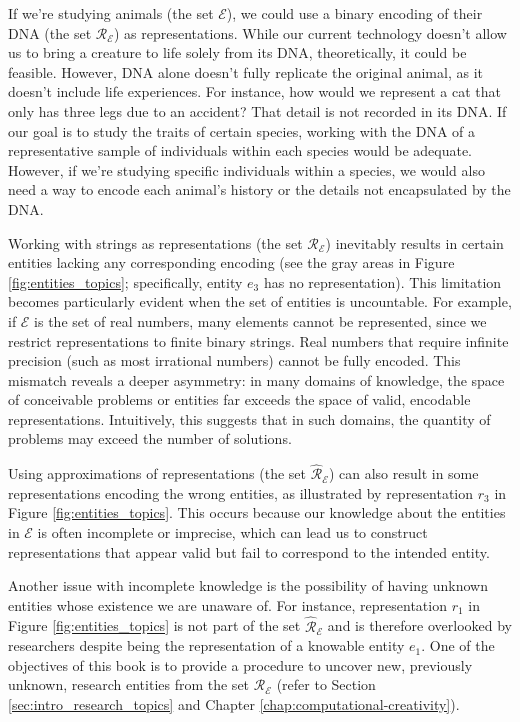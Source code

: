 \begin{example}
\label{ex:animals_DNA}
If we're studying animals (the set $\mathcal{E}$), we could use a binary encoding of their DNA (the set $\mathcal{R_\mathcal{E}}$) as representations. While our current technology doesn't allow us to bring a creature to life solely from its DNA, theoretically, it could be feasible. However, DNA alone doesn't fully replicate the original animal, as it doesn't include life experiences. For instance, how would we represent a cat that only has three legs due to an accident? That detail is not recorded in its DNA. If our goal is to study the traits of certain species, working with the DNA of a representative sample of individuals within each species would be adequate. However, if we're studying specific individuals within a species, we would also need a way to encode each animal's history or the details not encapsulated by the DNA.
\end{example}

Working with strings as representations (the set $\mathcal{R}_\mathcal{E}$) inevitably results in certain entities lacking any corresponding encoding (see the gray areas in Figure \ref{fig:entities_topics}; specifically, entity $e_3$ has no representation). This limitation becomes particularly evident when the set of entities is uncountable. For example, if $\mathcal{E}$ is the set of real numbers, many elements cannot be represented, since we restrict representations to finite binary strings. Real numbers that require infinite precision (such as most irrational numbers) cannot be fully encoded. This mismatch reveals a deeper asymmetry: in many domains of knowledge, the space of conceivable problems or entities far exceeds the space of valid, encodable representations. Intuitively, this suggests that in such domains, the quantity of problems may exceed the number of solutions.

Using approximations of representations (the set $\hat{\mathcal{R}}_\mathcal{E}$) can also result in some representations encoding the wrong entities, as illustrated by representation $r_3$ in Figure \ref{fig:entities_topics}. This occurs because our knowledge about the entities in $\mathcal{E}$ is often incomplete or imprecise, which can lead us to construct representations that appear valid but fail to correspond to the intended entity.

Another issue with incomplete knowledge is the possibility of having unknown entities whose existence we are unaware of. For instance, representation $r_1$ in Figure \ref{fig:entities_topics} is not part of the set $\hat{\mathcal{R}}_\mathcal{E}$ and is therefore overlooked by researchers despite being the representation of a knowable entity $e_1$. One of the objectives of this book is to provide a procedure to uncover new, previously unknown, research entities from the set $\mathcal{R}_\mathcal{E}$ (refer to Section \ref{sec:intro_research_topics} and Chapter \ref{chap:computational-creativity}).

